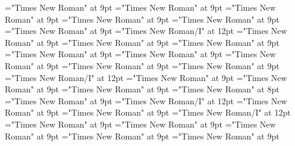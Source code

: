 \documentclass[gps1,twoside]{article}
\begin{document}
\font\spanpartofspeechmorphosyntaxanalysissharedgrammaticalinfosensesentrylastchildafter="Times New Roman" at 9pt
\font\spanspanslotsmorphosyntaxanalysissharedgrammaticalinfosensesentrybefore="Times New Roman" at 9pt
\font\slotsmorphosyntaxanalysissharedgrammaticalinfosensesentrybefore="Times New Roman" at 9pt
\font\spanspannameslotslotsmorphosyntaxanalysissharedgrammaticalinfosensesentrybefore="Times New Roman" at 9pt
\font\spannameslotslotsmorphosyntaxanalysissharedgrammaticalinfosensesentrylastchildafter="Times New Roman" at 9pt
\font\morphosyntaxanalysissensesensesentryafter="Times New Roman" at 9pt
\font\morphosyntaxanalysissensesensesentry="Times New Roman/I" at 12pt
\font\spanspanpartofspeechmorphosyntaxanalysissensesensesentrybefore="Times New Roman" at 9pt
\font\spanpartofspeechmorphosyntaxanalysissensesensesentrylastchildafter="Times New Roman" at 9pt
\font\spanspanslotsmorphosyntaxanalysissensesensesentrybefore="Times New Roman" at 9pt
\font\slotsmorphosyntaxanalysissensesensesentrybefore="Times New Roman" at 9pt
\font\spanspannameslotslotsmorphosyntaxanalysissensesensesentrybefore="Times New Roman" at 9pt
\font\spannameslotslotsmorphosyntaxanalysissensesensesentrylastchildafter="Times New Roman" at 9pt
\font\sensetypesensesensesentrybefore="Times New Roman" at 9pt
\font\sensetypesensesensesentryafter="Times New Roman" at 9pt
\font\sensetypesensesensesentry="Times New Roman/I" at 12pt
\font\spanspanabbreviationsensetypesensesensesentrybefore="Times New Roman" at 9pt
\font\spanspandefinitionorglosssensesensesentrybefore="Times New Roman" at 9pt
\font\spandefinitionorglosssensesensesentrylastchildafter="Times New Roman" at 9pt
\font\exampleexampleexamplessensesensesentrybefore="Times New Roman" at 8pt
\font\examplessensesensesentryafter="Times New Roman" at 9pt
\font\spanbzhexampleexampleexamplessensesensesentry="Times New Roman/I" at 12pt
\font\spanspanexampleexampleexamplessensesensesentrybefore="Times New Roman" at 9pt
\font\spanexampleexampleexamplessensesensesentrylastchildafter="Times New Roman" at 9pt
\font\spanexampleexampleexamplessensesensesentry="Times New Roman/I" at 12pt
\font\spanspantranslationtranslationtranslationsexampleexamplessensesensesentrybefore="Times New Roman" at 9pt
\font\spantranslationtranslationtranslationsexampleexamplessensesensesentrylastchildafter="Times New Roman" at 9pt
\font\spanspanencyclopedicinfosensesensesentrybefore="Times New Roman" at 9pt
\font\spanencyclopedicinfosensesensesentryfirstchildbefore="Times New Roman" at 9pt
\font\spanencyclopedicinfosensesensesentrylastchildafter="Times New Roman" at 9pt
\end{document}
